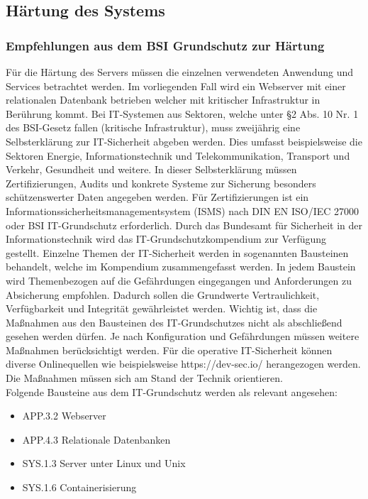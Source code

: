 \newpage
\subsection{Härtung des Systems}\label{kap:haertung_des_systems}


\subsubsection{Empfehlungen aus dem BSI Grundschutz zur Härtung}

F\"ur die H\"artung des Servers m\"ussen die einzelnen verwendeten Anwendung und Services betrachtet werden. Im vorliegenden Fall wird ein Webserver mit einer relationalen Datenbank betrieben welcher mit kritischer Infrastruktur in Ber\"uhrung kommt. Bei IT-Systemen aus Sektoren, welche unter \S2 Abs. 10 Nr. 1 des BSI-Gesetz fallen (kritische Infrastruktur), muss zweij\"ahrig eine Selbsterkl\"arung zur IT-Sicherheit abgeben werden. Dies umfasst beispielsweise die Sektoren Energie, Informationstechnik und Telekommunikation, Transport und Verkehr, Gesundheit und weitere. In dieser Selbsterkl\"arung m\"ussen Zertifizierungen, Audits und konkrete Systeme zur Sicherung besonders sch\"utzenswerter Daten angegeben werden. F\"ur Zertifizierungen ist ein Informationssicherheitsmanagementsystem (ISMS) nach DIN EN ISO/IEC 27000 oder BSI IT-Grundschutz erforderlich. Durch das Bundesamt f\"ur Sicherheit in der Informationstechnik wird das IT-Grundschutzkompendium zur Verf\"ugung gestellt.  Einzelne Themen der IT-Sicherheit werden in sogenannten Bausteinen behandelt, welche im Kompendium zusammengefasst werden. In jedem Baustein wird Themenbezogen auf die Gef\"ahrdungen eingegangen und Anforderungen zu Absicherung empfohlen. Dadurch sollen die Grundwerte Vertraulichkeit, Verf\"ugbarkeit und Integrit\"at gew\"ahrleistet werden. Wichtig ist, dass die Ma{\ss}nahmen aus den Bausteinen des IT-Grundschutzes nicht als abschlie{\ss}end gesehen werden d\"urfen. Je nach Konfiguration und Gef\"ahrdungen m\"ussen weitere Ma{\ss}nahmen ber\"ucksichtigt werden. F\"ur die operative IT-Sicherheit k\"onnen diverse Onlinequellen wie beispielsweise https://dev-sec.io/ herangezogen werden. Die Ma{\ss}nahmen m\"ussen sich am Stand der Technik orientieren. \\

Folgende Bausteine aus dem IT-Grundschutz werden als relevant angesehen:
  \begin{itemize}
      \item APP.3.2 Webserver
			\item APP.4.3 Relationale Datenbanken
      \item SYS.1.3 Server unter Linux und Unix
			\item SYS.1.6 Containerisierung
   \end{itemize} 

